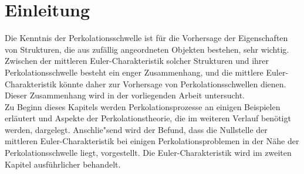 
\chapter{Einleitung}
Die Kenntnis der Perkolationsschwelle ist f\"ur die Vorhersage der Eigenschaften von Strukturen, die aus zuf\"allig angeordneten Objekten bestehen, sehr wichtig. Zwischen der mittleren Euler-Charakteristik solcher Strukturen und ihrer Perkolationsschwelle besteht ein enger Zusammenhang, und die mittlere Euler-Charakteristik k\"onnte daher zur Vorhersage von Perkolationsschwellen dienen. Dieser Zusammenhang wird in der vorliegenden Arbeit untersucht.
\\Zu Beginn dieses Kapitels werden Perkolationsprozesse an einigen Beispielen erl\"autert und Aspekte der Perkolationstheorie, die im weiteren Verlauf ben\"otigt werden, dargelegt. Anschlie"send wird der Befund, dass die Nullstelle der mittleren Euler-Charakteristik bei einigen Perkolationsproblemen in der N\"ahe der Perkolationsschwelle liegt, vorgestellt. Die Euler-Charakteristik wird im zweiten Kapitel ausf\"uhrlicher behandelt.
